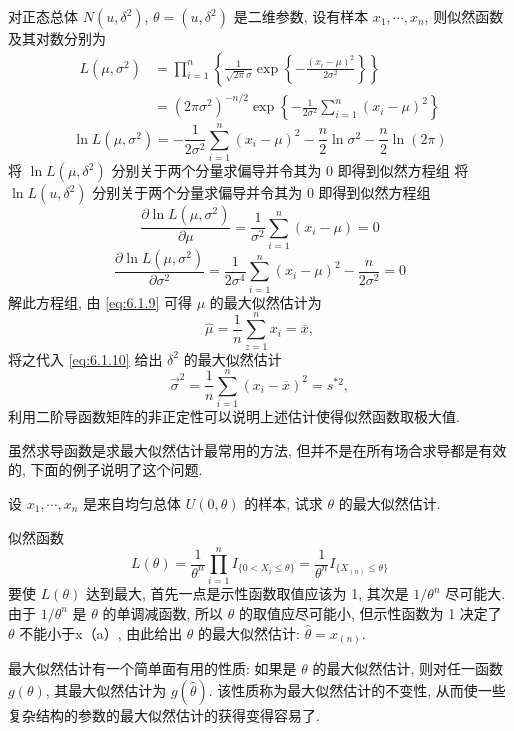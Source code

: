 \begin{example}\label{exam:6.1.7}
对正态总体 $N(u,\delta^2)$, $\theta=(u,\delta^2)$ 是二维参数, 设有样本 $x_1,\cdots,x_n$, 则似然函数及其对数分别为
\begin{align*}
L\left(\mu,\sigma^{2}\right)
&=\prod_{i=1}^{n}\left\{\frac{1}{\sqrt{2\pi}\sigma}\exp \left\{-\frac{\left(x_{i}-\mu\right)^{2}}{2 \sigma^{2}}\right\}\right\}\\
&=\left(2\pi\sigma^{2}\right)^{-n/2}\exp\left\{-\frac{1}{2 \sigma^{2}}\sum_{i=1}^{n}\left(x_{i}-\mu\right)^{2}\right\}
\end{align*}
\[\ln L\left(\mu,\sigma^{2}\right)=-\frac{1}{2\sigma^{2}} \sum_{i=1}^{n}\left(x_{i}-\mu\right)^{2}-\frac{n}{2} \ln \sigma^{2}-\frac{n}{2}\ln(2\pi)\]
将 $\ln L(\mu,\delta^2)$ 分别关于两个分量求偏导并令其为 0 即得到似然方程组
将 $\ln L(u,\delta^2)$ 分别关于两个分量求偏导并令其为 0 即得到似然方程组
\begin{equation}\label{eq:6.1.9}
\frac{\partial\ln L\left(\mu, \sigma^{2}\right)}{\partial \mu}=\frac{1}{\sigma^{2}} \sum_{i=1}^{n}\left(x_{i}-\mu\right)=0
\end{equation}
\begin{equation}\label{eq:6.1.10}
\frac{\partial \ln L\left(\mu, \sigma^{2}\right)}{\partial \sigma^{2}}=\frac{1}{2 \sigma^{4}} \sum_{i=1}^{n}\left(x_{i}-\mu\right)^{2}-\frac{n}{2\sigma^{2}}=0
\end{equation}
解此方程组, 由 \eqref{eq:6.1.9} 可得 $\mu$ 的最大似然估计为
\[\hat{\mu}=\frac{1}{n} \sum_{z=1}^{n} x_{i}=\overline{x},\]
将之代入 \eqref{eq:6.1.10} 给出 $\delta^2$ 的最大似然估计
\[\vec{\sigma}^{2}=\frac{1}{n} \sum_{i=1}^{n}\left(x_{i}-\overline{x}\right)^{2}=s^{* 2},\]
利用二阶导函数矩阵的非正定性可以说明上述估计使得似然函数取极大值.

虽然求导函数是求最大似然估计最常用的方法, 但并不是在所有场合求导都是有效的, 下面的例子说明了这个问题.
\end{example}

\begin{example}%
设 $x_1,\cdots,x_n$ 是来自均匀总体 $U(0,\theta)$ 的样本, 试求 $\theta$ 的最大似然估计.
\end{example}
\begin{solution}
似然函数
\[L(\theta)=\frac{1}{\theta^n}\prod_{i=1}^nI_{\{0<X_i\leqslant\theta\}}=\frac{1}{\theta^n}I_{\{X_{(n)}\leqslant\theta\}} \]
要使 $L(\theta)$ 达到最大, 首先一点是示性函数取值应该为 1, 其次是 $1/\theta^n$ 尽可能大. 由于 $1/\theta^n$ 是 $\theta$ 的单调减函数, 所以 $\theta$ 的取值应尽可能小, 但示性函数为 1 决定了 $\theta$ 不能小于x（a）, 由此给出 $\theta$ 的最大似然估计: $\hat{\theta}=x_{(n)}$.

最大似然估计有一个简单面有用的性质: 如果是 $\theta$ 的最大似然估计, 则对任一函数 $g(\theta)$, 其最大似然估计为 $g(\hat{\theta})$. 该性质称为最大似然估计的不变性, 从而使一些复杂结构的参数的最大似然估计的获得变得容易了.
\end{solution}

